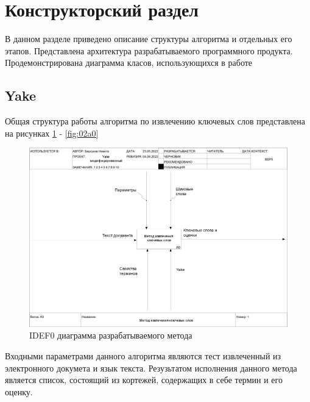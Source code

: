 \section{Конструкторский раздел}
В данном разделе приведено описание структуры алгоритма и отдельных его этапов.
Представлена архитектура разрабатываемого программного продукта.
Продемонстрирована диаграмма класов, использующихся в работе

\subsection{Yake}
Общая структура работы алгоритма по извлечению ключевых слов представлена на рисунках \ref{fig:01a0} - \ref{fig:02a0}


\begin{figure}[!h]
	\centering
	\includegraphics[width=1\linewidth]{src/img/idef0/Yake/01_A0}
	\caption{IDEF0 диаграмма разрабатываемого метода}
	\label{fig:01a0}
\end{figure}
Входными параметрами данного алгоритма являются тест извлеченный из электронного докумета и язык текста.
Резузьтатом исполнения данного метода является список, состоящий из кортежей, содержащих в себе термин и его оценку.

